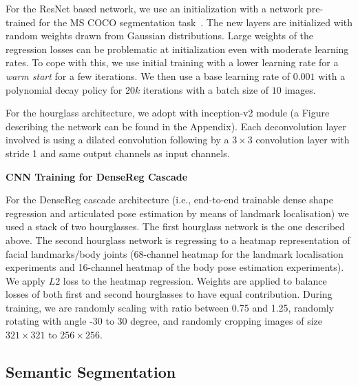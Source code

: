 For the ResNet based network, we use an initialization with a network pre-trained for the MS COCO segmentation task~\cite{lin2014microsoft}. The new layers are initialized with random weights drawn from Gaussian distributions. Large weights of the regression losses can be problematic at initialization even with moderate learning rates. To cope with this, we use initial training with a lower learning rate for a \textit{warm start} for a few iterations. We then use a base learning rate of $0.001$ with a polynomial decay policy for $20k$ iterations with a batch size of $10$ images.

For the hourglass architecture, we adopt \cite{newell2016stacked} with inception-v2 module (a Figure describing the network can be found in the Appendix). Each deconvolution layer involved is using a dilated convolution following by a $3\times 3$ convolution layer with stride 1 and same output channels as input channels. 


\textbf{CNN Training for DenseReg Cascade} 

For the DenseReg cascade architecture (i.e., end-to-end trainable dense shape regression and articulated pose estimation by means of landmark localisation) we used a stack of two hourglasses. The first hourglass network is the one described above. The second hourglass network is regressing to a  heatmap representation of facial landmarks/body joints (68-channel heatmap for the landmark localisation experiments and 16-channel heatmap of the body pose estimation experiments). We apply $L2$ loss to the heatmap regression. Weights are applied to balance losses of both first and second hourglasses to have equal contribution. During training, we are randomly scaling with ratio between 0.75 and 1.25, randomly rotating with angle -30 to 30 degree, and randomly cropping images of size $321\times321$ to $256\times256$.

\subsection{Semantic Segmentation}
\label{sec:exp_semantic_segmentation}

